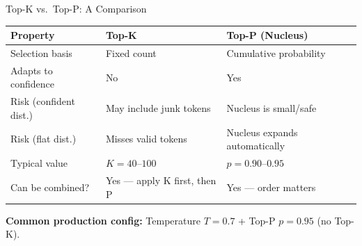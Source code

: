 \documentclass{beamer}
\begin{document}
\begin{frame}{Top-K vs.\ Top-P: A Comparison}
    \centering
    \small
    \begin{tabular}{@{}lll@{}}
        \toprule
        \textbf{Property} & \textbf{Top-K} & \textbf{Top-P (Nucleus)} \\ \midrule
        Selection basis     & Fixed count                & Cumulative probability       \\
        Adapts to confidence & No                        & Yes                          \\
        Risk (confident dist.) & May include junk tokens  & Nucleus is small/safe        \\
        Risk (flat dist.)      & Misses valid tokens      & Nucleus expands automatically \\
        Typical value       & $K = 40$--$100$            & $p = 0.90$--$0.95$           \\
        Can be combined?    & Yes --- apply K first, then P & Yes --- order matters    \\ \bottomrule
    \end{tabular}

    \vspace{0.3cm}
    \textbf{Common production config:} Temperature $T=0.7$ + Top-P $p=0.95$ (no Top-K).
\end{frame}
\end{document}
